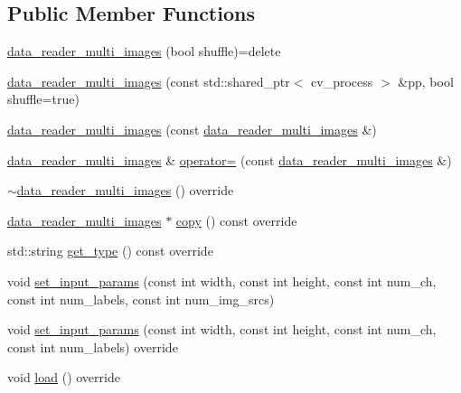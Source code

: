 \subsection*{Public Member Functions}
\begin{DoxyCompactItemize}
\item 
\hyperlink{classlbann_1_1data__reader__multi__images_a91725ae909007b26410837257aa921dc}{data\+\_\+reader\+\_\+multi\+\_\+images} (bool shuffle)=delete
\item 
\hyperlink{classlbann_1_1data__reader__multi__images_a2aa9155e574084985bf3b1bd3663d1c5}{data\+\_\+reader\+\_\+multi\+\_\+images} (const std\+::shared\+\_\+ptr$<$ cv\+\_\+process $>$ \&pp, bool shuffle=true)
\item 
\hyperlink{classlbann_1_1data__reader__multi__images_abc055112884c444886fe8f7eabe58f05}{data\+\_\+reader\+\_\+multi\+\_\+images} (const \hyperlink{classlbann_1_1data__reader__multi__images}{data\+\_\+reader\+\_\+multi\+\_\+images} \&)
\item 
\hyperlink{classlbann_1_1data__reader__multi__images}{data\+\_\+reader\+\_\+multi\+\_\+images} \& \hyperlink{classlbann_1_1data__reader__multi__images_a8d9eae4dde10654c1f1bf7c1fe685e99}{operator=} (const \hyperlink{classlbann_1_1data__reader__multi__images}{data\+\_\+reader\+\_\+multi\+\_\+images} \&)
\item 
\hyperlink{classlbann_1_1data__reader__multi__images_a172a9a9cfe4406d876172679c1c6238a}{$\sim$data\+\_\+reader\+\_\+multi\+\_\+images} () override
\item 
\hyperlink{classlbann_1_1data__reader__multi__images}{data\+\_\+reader\+\_\+multi\+\_\+images} $\ast$ \hyperlink{classlbann_1_1data__reader__multi__images_a46e1b7fab6ac5af4398cb9b5da900a74}{copy} () const override
\item 
std\+::string \hyperlink{classlbann_1_1data__reader__multi__images_a9939a88a40caf7b2a27de08deca54ac1}{get\+\_\+type} () const override
\item 
void \hyperlink{classlbann_1_1data__reader__multi__images_a57824ec9de5c1131b2f15a0cb3d4ab75}{set\+\_\+input\+\_\+params} (const int width, const int height, const int num\+\_\+ch, const int num\+\_\+labels, const int num\+\_\+img\+\_\+srcs)
\item 
void \hyperlink{classlbann_1_1data__reader__multi__images_afdb403556ed04a9142932e89ac60435e}{set\+\_\+input\+\_\+params} (const int width, const int height, const int num\+\_\+ch, const int num\+\_\+labels) override
\item 
void \hyperlink{classlbann_1_1data__reader__multi__images_afb8adef1f9ac6723d71ae5afc29b01ec}{load} () override

\end{DoxyCompactItemize}
